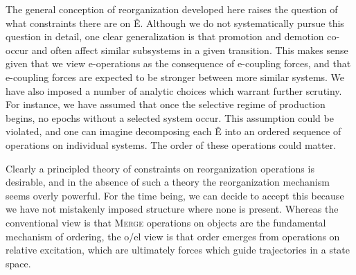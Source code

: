   The general conception of reorganization developed here raises the question of what constraints there are on Ê. Although we do not systematically pursue this question in detail, one clear generalization is that promotion and demotion co-occur and often affect similar subsystems in a given transition. This makes sense given that we view e-operations as the consequence of e-coupling forces, and that e-coupling forces are expected to be stronger between more similar systems. We have also imposed a number of analytic choices which warrant further scrutiny. For instance, we have assumed that once the selective regime of production begins, no epochs without a selected system occur. This assumption could be violated, and one can imagine decomposing each Ê into an ordered sequence of operations on individual systems. The order of these operations could matter.

  Clearly a principled theory of constraints on reorganization operations is desirable, and in the absence of such a theory the reorganization mechanism seems overly powerful. For the time being, we can decide to accept this because we have not mistakenly imposed structure where none is present. Whereas the conventional view is that \textsc{Merge} operations on objects are the fundamental mechanism of ordering, the o/el view is that order emerges from operations on relative excitation, which are ultimately forces which guide trajectories in a state space.

